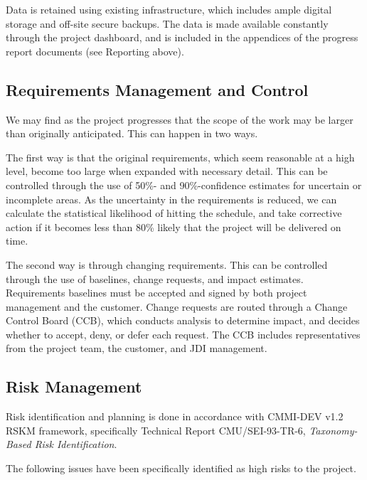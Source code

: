 \documentclass[11pt]{article}
\begin{document}
Data is retained using existing infrastructure, which includes ample digital storage and off-site
secure backups.  The data is made available constantly through the project dashboard, and is
included in the appendices of the progress report documents (see Reporting above).

\subsection{Requirements Management and Control}
We may find as the project progresses that the scope of the work may be larger than originally
anticipated.  This can happen in two ways.

The first way is that the original requirements, which seem reasonable at a high level, become too
large when expanded with necessary detail.  This can be controlled through the use of 50\%- and
90\%-confidence estimates for uncertain or incomplete areas.  As the uncertainty in the requirements
is reduced, we can calculate the statistical likelihood of hitting the schedule, and take corrective
action if it becomes less than 80\% likely that the project will be delivered on time.

The second way is through changing requirements.  This can be controlled through the use of
baselines, change requests, and impact estimates.  Requirements baselines must be accepted and
signed by both project management and the customer.  Change requests are routed through a Change
Control Board (CCB), which conducts analysis to determine impact, and decides whether to accept,
deny, or defer each request.  The CCB includes representatives from the project team, the customer,
and JDI management.


\subsection{Risk Management}
Risk identification and planning is done in accordance with CMMI-DEV v1.2 RSKM framework,
specifically Technical Report CMU/SEI-93-TR-6, \textit{Taxonomy-Based Risk Identification}.

The following issues have been specifically identified as high risks to the project.
\end{document}
